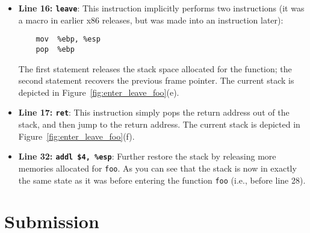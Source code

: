 \begin{itemize}
\item \textbf{Line 16: \texttt{leave}}: This
instruction implicitly performs two instructions (it was a macro
in earlier x86 releases, but was made into an instruction later):
\begin{verbatim}
    mov  %ebp, %esp
    pop  %ebp
\end{verbatim}
The first statement releases the stack space allocated for the function; 
the second statement recovers the previous frame pointer. 
The current stack is depicted in Figure~\ref{fig:enter_leave_foo}(e). 

\item \textbf{Line 17: \texttt{ret}}: This instruction simply pops the return 
address out of the stack, and then jump to the return address.
The current stack is depicted in Figure~\ref{fig:enter_leave_foo}(f).

\item \textbf{Line 32: \texttt{addl \$4, \%esp}}: Further restore the stack by
releasing more memories allocated for {\tt foo}. 
As you can see that the stack is now in exactly the same state as it was
before entering the function {\tt foo} (i.e., before line 28). 
\end{itemize}



\section{Submission}






